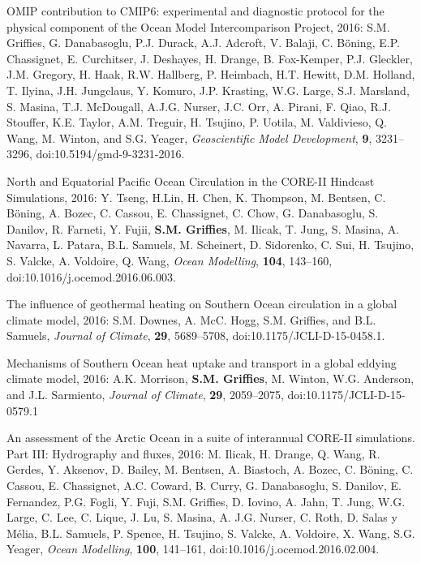 \begin{etaremune}
\item OMIP contribution to CMIP6: experimental and diagnostic protocol for the physical component of the Ocean Model Intercomparison  Project, 2016: S.M. Grif\/f\/ies, G. Danabasoglu, P.J. Durack,
  A.J. Adcroft, V. Balaji, C. B\"{o}̈ning, E.P. Chassignet,
  E. Curchitser, J. Deshayes, H. Drange, B. Fox-Kemper, P.J. Gleckler,
  J.M. Gregory, H. Haak, R.W. Hallberg, P. Heimbach, H.T. Hewitt,
  D.M. Holland, T. Ilyina, J.H. Jungclaus, Y. Komuro, J.P. Krasting,
  W.G. Large, S.J. Marsland, S. Masina, T.J. McDougall, A.J.G. Nurser,
  J.C. Orr, A. Pirani, F. Qiao, R.J. Stouffer, K.E. Taylor,
  A.M. Treguir, H. Tsujino, P. Uotila, M. Valdivieso, Q. Wang,
  M. Winton, and S.G. Yeager, {\it Geoscientific Model Development},
  {\bf 9}, 3231--3296, doi:10.5194/gmd-9-3231-2016.

\item North and Equatorial Pacific Ocean Circulation in the CORE-II
  Hindcast Simulations, 2016: Y. Tseng, H.Lin, H. Chen, K.  Thompson,
  M. Bentsen, C. B\"{o}ning, A. Bozec, C. Cassou, E.  Chassignet,
  C. Chow, G. Danabasoglu, S. Danilov, R. Farneti, Y. Fujii, {\bf
    S.M. Grif\/f\/ies}, M. Ilicak, T. Jung, S. Masina, A. Navarra,
  L. Patara, B.L.  Samuels, M. Scheinert, D. Sidorenko, C. Sui,
  H. Tsujino, S. Valcke, A. Voldoire, Q. Wang, {\it Ocean Modelling},
  {\bf 104}, 143--160, doi:10.1016/j.ocemod.2016.06.003.

\item The influence of geothermal heating on Southern Ocean
  circulation in a global climate model, 2016: S.M. Downes,
  A. McC. Hogg, S.M. Grif\/f\/ies, and B.L. Samuels, {\it
    Journal of Climate}, {\bf 29}, 5689--5708,
  doi:10.1175/JCLI-D-15-0458.1.

\item Mechanisms of Southern Ocean heat uptake and transport in a
  global eddying climate model, 2016: A.K. Morrison, {\bf
    S.M. Grif\/f\/ies}, M. Winton, W.G. Anderson, and J.L. Sarmiento,
  {\it Journal of Climate}, {\bf 29}, 2059--2075,
  doi:10.1175/JCLI-D-15-0579.1

\item An assessment of the Arctic Ocean in a suite of interannual
  CORE-II simulations. Part III: Hydrography and fluxes, 2016:
  M. Ilicak, H. Drange, Q. Wang, R. Gerdes, Y. Aksenov, D. Bailey,
  M. Bentsen, A. Biastoch, A. Bozec, C. B\"{o}ning, C. Cassou,
  E. Chassignet, A.C. Coward, B. Curry, G. Danabasoglu, S. Danilov,
  E. Fernandez, P.G. Fogli, Y. Fuji, S.M. Grif\/f\/ies,
  D. Iovino, A. Jahn, T. Jung, W.G. Large, C. Lee, C. Lique, J. Lu,
  S. Masina, A. J.G. Nurser, C. Roth, D. Salas y M\'{e}lia,
  B.L. Samuels, P. Spence, H. Tsujino, S. Valcke, A. Voldoire,
  X. Wang, S.G. Yeager, {\it Ocean Modelling}, {\bf 100}, 141--161,
  doi:10.1016/j.ocemod.2016.02.004.


\end{etaremune}
